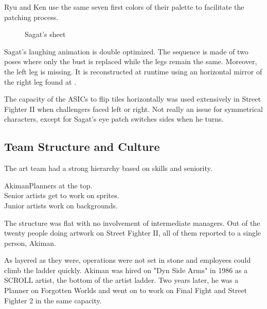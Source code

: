 Ryu and Ken use the same seven first colors of their palette to facilitate the patching process. 






 \begin{figure}[H]
\caption*{Sagat's sheet}
\end{figure}

Sagat's laughing animation is double optimized. The sequence is made of two poses where only the bust is replaced while the legs remain the same. Moreover, the left leg is missing. It is reconstructed at runtime using an horizontal mirror of the right leg found at .

\begin{trivia}
The capacity of the ASICs to flip tiles horizontally was used extensively in Street Fighter II when challengers faced left or right. Not really an issue for symmetrical characters, except for Sagat's eye patch switches sides when he turns.
\end{trivia}

\pagebreak

\subsection{Team Structure and Culture}

The art team had a strong hierarchy based on skills and seniority.

\begin{q}{Akiman\cite{akiman2003}}Planners at the top.\\
Senior artists get to work on sprites. \\
Junior artists work on backgrounds.
\end{q}

The structure was flat with no involvement of intermediate managers. Out of the twenty people doing artwork on Street Fighter II, all of them reported to a single person, Akiman\cite{sf2_oral_history}.




As layered as they were, operations were not set in stone and employees could climb the ladder quickly. Akiman was hired on "Dyn Side Arms" in 1986 as a SCROLL artist, the bottom of the artist ladder. Two years later, he was a Planner on Forgotten Worlds and went on to work on Final Fight and Street Fighter 2 in the same capacity.

